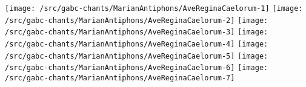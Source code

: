 \texttt{[image: /src/gabc-chants/MarianAntiphons/AveReginaCaelorum-1]}%
\ifx\betweenLilyPondSystem \undefined
  \linebreak
\else
  \expandafter{}%
\fi
\texttt{[image: /src/gabc-chants/MarianAntiphons/AveReginaCaelorum-2]}%
\ifx\betweenLilyPondSystem \undefined
  \linebreak
\else
  \expandafter{}%
\fi
\texttt{[image: /src/gabc-chants/MarianAntiphons/AveReginaCaelorum-3]}%
\ifx\betweenLilyPondSystem \undefined
  \linebreak
\else
  \expandafter{}%
\fi
\texttt{[image: /src/gabc-chants/MarianAntiphons/AveReginaCaelorum-4]}%
\ifx\betweenLilyPondSystem \undefined
  \linebreak
\else
  \expandafter{}%
\fi
\texttt{[image: /src/gabc-chants/MarianAntiphons/AveReginaCaelorum-5]}%
\ifx\betweenLilyPondSystem \undefined
  \linebreak
\else
  \expandafter{}%
\fi
\texttt{[image: /src/gabc-chants/MarianAntiphons/AveReginaCaelorum-6]}%
\ifx\betweenLilyPondSystem \undefined
  \linebreak
\else
  \expandafter{}%
\fi
\texttt{[image: /src/gabc-chants/MarianAntiphons/AveReginaCaelorum-7]}%
